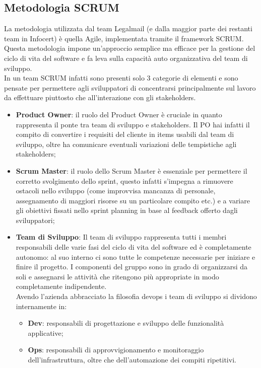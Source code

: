 \subsection{Metodologia SCRUM}
La metodologia utilizzata dal team Legalmail (e dalla maggior parte dei restanti team in Infocert) è quella Agile, implementata tramite il \gls{framework} SCRUM.
Questa metodologia impone un'approccio semplice ma efficace per la gestione del ciclo di vita del software e fa leva sulla capacità auto organizzativa del team di sviluppo. \\
In un team SCRUM infatti sono presenti solo 3 categorie di elementi e sono pensate per permettere agli sviluppatori di concentrarsi principalmente sul lavoro da effettuare piuttosto che all'interazione con gli \gls{stakeholders}.
\begin{itemize}
	\item \textbf{Product Owner}: il ruolo del Product Owner è cruciale in quanto rappresenta il ponte tra team di sviluppo e stakeholders. Il PO hai infatti il compito di convertire i requisiti del cliente in items usabili dal team di sviluppo, oltre ha comunicare eventuali variazioni delle tempistiche agli stakeholders;
	\item \textbf{Scrum Master}: il ruolo dello Scrum Master è essenziale per permettere il corretto svolgimento dello sprint, questo infatti s'impegna a rimuovere ostacoli nello sviluppo (come improvvisa mancanza di personale, assegnamento di maggiori risorse su un particolare compito etc.) e a variare gli obiettivi fissati nello sprint planning in base al feedback offerto dagli sviluppatori;
	\item \textbf{Team di Sviluppo}: Il team di sviluppo rappresenta tutti i membri responsabili delle varie fasi del ciclo di vita del software ed è completamente autonomo: al suo interno ci sono tutte le competenze necessarie per iniziare e finire il progetto. I componenti del gruppo sono in grado di organizzarsi da soli e assegnarsi le attività che ritengono più appropriate in modo completamente indipendente. \\
	Avendo l'azienda abbracciato la filosofia \gls{devops} i team di sviluppo si dividono internamente in:
	\begin{itemize}
		\item \textbf{Dev}: responsabili di progettazione e sviluppo delle funzionalità applicative;
		\item \textbf{Ops}: responsabili di approvvigionamento e monitoraggio dell'infrastruttura, oltre che dell'automazione dei compiti ripetitivi.
	\end{itemize}
\end{itemize}
